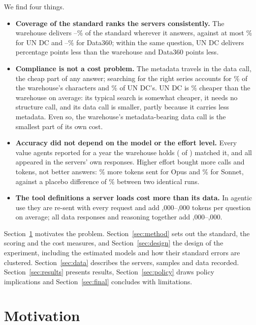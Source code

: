 \documentclass[11pt,a4paper]{article}
\begin{document}
We find four things.
\begin{itemize}
\item \textbf{Coverage of the standard ranks the servers consistently.} The warehouse delivers \whShareMin--\whShareMax\% of the standard wherever it answers, against at most \unShareMax\% for UN DC and \dShareMin--\dShareMax\% for Data360; within the same question, UN DC delivers \efShareUn{} percentage points less than the warehouse and Data360 \efShareD{} points less.
\item \textbf{Compliance is not a cost problem.} The metadata travels in the data call, the cheap part of any answer; searching for the right series accounts for \discWh\% of the warehouse's characters and \discUn\% of UN DC's. UN DC is \efCharsUn\% cheaper than the warehouse on average: its typical search is somewhat cheaper, it needs no structure call, and its data call is smaller, partly because it carries less metadata. Even so, the warehouse's metadata-bearing data call is the smallest part of its own cost.
\item \textbf{Accuracy did not depend on the model or the effort level.} Every value agents reported for a year the warehouse holds ( of ) matched it, and all  appeared in the servers' own responses. Higher effort bought more calls and tokens, not better answers: \efOpusSent\% more tokens sent for Opus and \efSonnetSent\% for Sonnet, against a placebo difference of \efRepSent\% between two identical runs.
\item \textbf{The tool definitions a server loads cost more than its data.} In agentic use they are re-sent with every request and add ,000--,000 tokens per question on average; all data responses and reasoning together add \respMin{},000--\respMax{},000.
\end{itemize}

Section~\ref{sec:motivation} motivates the problem. Section~\ref{sec:method} sets out the standard, the scoring and the cost measures, and Section~\ref{sec:design} the design of the experiment, including the estimated models and how their standard errors are clustered. Section~\ref{sec:data} describes the servers, samples and data recorded. Section~\ref{sec:results} presents results, Section~\ref{sec:policy} draws policy implications and Section~\ref{sec:final} concludes with limitations.

\section{Motivation}\label{sec:motivation}
\end{document}
